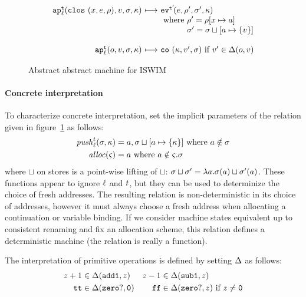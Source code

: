 \documentclass[preprint,onecolumn,9pt]{sigplanconf} %
\begin{document}
\begin{figure}
\begin{gather*}
\begin{array}{@{}r@{\ }c@{\ }l@{}}
\ap[^\mcntr_\mlab]{\clos{\mvar,\mexp,\menv},\mval,\msto,\mkont} & \machstep&
\ev[^{\mcntr'}\!]{\mexp,\menv',\msto',\mkont}
\\
&&\text{ where } \menv' = \menv[\mvar\mapsto\maddr] \\
&&\phantom{\text{ where }} \msto' = \msto\sqcup[\maddr\mapsto\{\mval\}] \\
\\
\ap[^\mcntr_\mlab]{\mop,\mval,\msto,\mkont} & \machstep&
\co{\mkont,\mval',\msto}
\text{ if } \mval'\in\interpdelta(\mop,\mval)
\end{array}
\end{gather*}
\caption{Abstract abstract machine for ISWIM}
\label{fig:aam}
\end{figure}


\paragraph{Concrete interpretation} To characterize concrete interpretation, set the implicit
parameters of the relation given in figure~\ref{fig:aam} as follows:
\begin{align*}
\mathit{push}_{\ell}^{t}(\sigma,\kappa) &= a,\sigma\sqcup[a\mapsto\{\kappa\}]
\mbox{ where }a \notin\sigma
\\
\mathit{alloc}(\varsigma) &= a \mbox{ where } a \notin \varsigma.\sigma
\end{align*}
where $\sqcup$ on stores is a point-wise lifting of $\sqcup$: $\sigma
\sqcup \sigma' = \lambda a. \sigma(a) \sqcup
\sigma'(a)$. These functions appear to ignore ${\ell}$ and
${t}$, but they can be used to determinize the choice of fresh
addresses.  The resulting relation is non-deterministic in its choice
of addresses, however it must always choose a fresh address when
allocating a continuation or variable binding.  If we consider machine
states equivalent up to consistent renaming and fix an allocation
scheme, this relation defines a deterministic machine (the relation is
really a function).

The interpretation of primitive operations is defined by setting
$\Delta$ as follows:
\begin{align*}
z+1 &\in \Delta({\tt add1},z) &
z-1 &\in \Delta({\tt sub1},z)\\
{\tt tt} &\in \Delta({\tt zero?},{\tt 0}) &
{\tt ff} &\in \Delta({\tt zero?},z)\text{ if }z\neq {\tt 0}\\
\end{align*}
\end{document}
